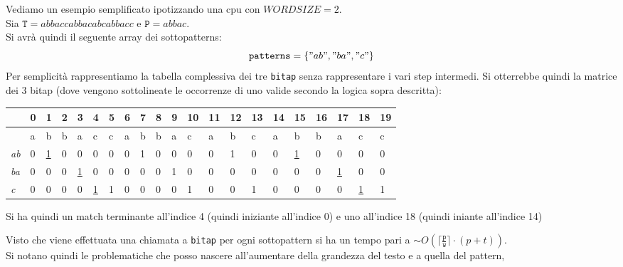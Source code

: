 \documentclass[a4paper,12pt, oneside]{article}
\begin{document}
\begin{esempio}
  Vediamo un esempio semplificato ipotizzando una cpu con
  $WORDSIZE=2$.\\
  Sia $\mathtt{T}=abbaccabbacabcabbacc$ e $\mathtt{P}=abbac$.\\
  Si avrà quindi il seguente array dei sottopatterns:
  \[\mathtt{patterns}=\{"ab", "ba", "c"\}\]
  Per semplicità rappresentiamo la tabella complessiva dei tre
  \texttt{bitap} senza rappresentare i vari step intermedi. Si
  otterrebbe quindi la matrice dei 3 bitap (dove vengono sottolineate
  le occorrenze di uno valide secondo la logica sopra descritta):
  \begin{center}
    \begin{table}[H]
      \begin{tabular}{l|l|l|l|l|l|l|l|l|l|l|l|l|l|l|l|l|l|l|l|l|}
        \hline
        & 0 & 1 & 2 & 3 & 4 & 5 & 6 & 7 & 8 & 9 & 10 & 11 & 12 & 13 &
                                                                      14
        & 15 & 16 & 17 & 18 & 19 \\ \hline
        & a & b & b & a & c & c & a & b & b & a & c & a & b & c & a &
                                                                      b
             & b & a & c & c \\ \hline\hline  
        \textit{ab} & 0 & \underline{1} & 0 & 0 & 0 & 0 & 0 & 1 & 0 &
                                                                      0
                                                & 0 & 0 & 1 & 0 & 0 &
                                                                  \underline{1} 
             & 0 & 0 & 0 & 0 \\ \hline   
        \textit{ba} & 0 & 0 & 0 & \underline{1} & 0 & 0 & 0 & 0 & 0 &
                                                                      1
                                                & 0 & 0 & 0 & 0 & 0 &
                                                                      0
             & 0 & \underline{1} & 0 & 0 \\ \hline   
        \textit{c} & 0 & 0 & 0 & 0 & \underline{1} & 1 & 0 & 0 & 0 & 0
                                                & 1 & 0 & 0 & 1 & 0 &
                                                                      0
             & 0 & 0 & \underline{1} & 1 \\ \hline   
      \end{tabular}
    \end{table}
  \end{center}
  Si ha quindi un match terminante all'indice 4 (quindi iniziante all'indice
  0) e uno all'indice 18 (quindi iniante all'indice 14) 
\end{esempio}
Visto che viene effettuata una chiamata a \texttt{bitap} per ogni
sottopattern si ha un tempo pari a $\sim O\left(\lceil
  \frac{\mathtt{p}}{\mathtt{w}}\rceil\cdot (p + t)\right)$.\\
Si notano quindi le problematiche che posso nascere all'aumentare
della grandezza del testo e a quella del pattern,
\end{document}

